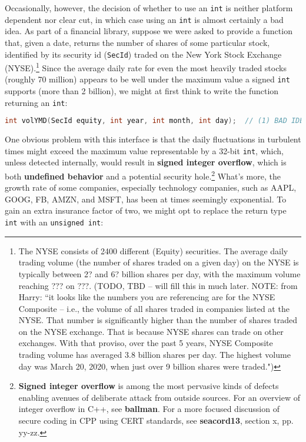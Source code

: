 Occasionally, however, the decision of whether to use an \texttt{int} is
neither platform dependent nor clear cut, in which case using an
\texttt{int} is almost certainly a bad idea. As part of a financial
library, suppose we were asked to provide a function that, given a date,
returns the number of shares of some particular stock, identified by its
security id (\texttt{SecId}) traded on the New York Stock Exchange
(NYSE).\footnote{The NYSE consists of 2400 different (Equity) securities. The average daily trading volume (the number of shares traded on a given day) on the NYSE is typically  between 2? and 6? billion shares per day, with the maximum volume reaching ??? on ???. (TODO, TBD -- will fill this in much later. NOTE: from Harry: ``it looks like the numbers you are referencing are for the NYSE Composite -- i.e., the volume of all shares traded in companies listed at the NYSE. That number is significantly higher than the number of shares traded on the NYSE exchange. That is because NYSE shares can trade on other exchanges. With that proviso, over the past 5 years, NYSE Composite trading volume has averaged 3.8 billion shares per day. The highest volume day was March 20, 2020, when just over 9 billion shares were traded.")} Since the average daily rate
for even the most heavily traded stocks (roughly 70 million) appears to
be well under the maximum value a signed \texttt{int} supports (more
than 2 billion), we might at first think to write the function
returning an \texttt{int}:

\begin{lstlisting}[language=C++]
int volYMD(SecId equity, int year, int month, int day);  // (1) BAD IDEA
\end{lstlisting}

\noindent One obvious problem with this interface is that the daily fluctuations
in turbulent times might exceed the maximum value representable by a
32-bit \texttt{int}, which, unless detected internally, would result in
\textbf{signed integer overflow}, which is both \textbf{undefined
behavior} and a potential security hole.{\cprotect\footnote{\textbf{Signed
integer overflow} is among the most pervasive kinds of defects
enabling avenues of deliberate attack from outside sources. For an overview of integer overflow in C++, see \textbf{ballman}. For a more focused discussion of secure coding in CPP using CERT standards, see \textbf{seacord13}, section x, pp. yy-zz.}} What's more, the growth rate of some companies,
especially technology companies, such as AAPL, GOOG, FB, AMZN, and MSFT, has
been at times seemingly exponential. To gain an extra
insurance factor of two, we might opt to replace the return type
\texttt{int} with an \texttt{unsigned}~\texttt{int}:

